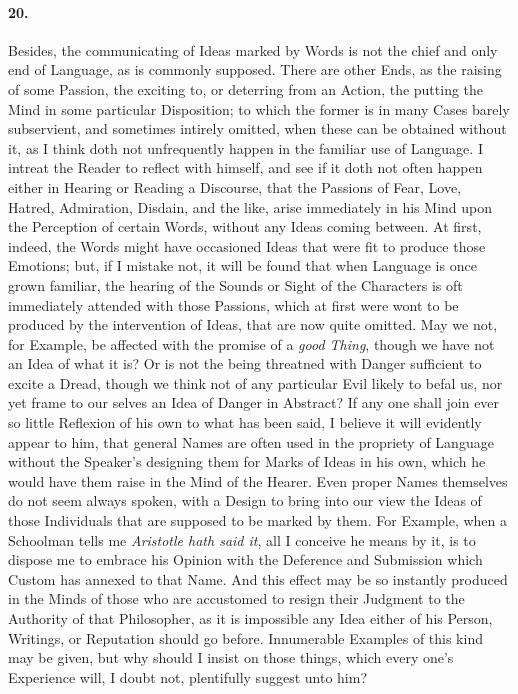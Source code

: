 \documentclass[]{article}
\newenvironment{sectionbody}{}{}
\begin{document}
\begin{sectionbody}
\paragraph{20.} Besides, the communicating of Ideas marked by Words is not the
chief and only end of Language, as is commonly supposed.  There
are other Ends, as the raising of some Passion, the exciting to,
or deterring from an Action, the putting the Mind in some
particular Disposition; to which the former is in many Cases
barely subservient, and sometimes intirely omitted, when these
can be obtained without it, as I think doth not unfrequently
happen in the familiar use of Language.  I intreat the Reader to
reflect with himself, and see if it doth not often happen either
in Hearing or Reading a Discourse, that the Passions of Fear,
Love, Hatred, Admiration, Disdain, and the like, arise
immediately in his Mind upon the Perception of certain Words,
without any Ideas coming between.  At first, indeed, the Words
might have occasioned Ideas that were fit to produce those
Emotions; but, if I mistake not, it will be found that when
Language is once grown familiar, the hearing of the Sounds or
Sight of the Characters is oft immediately attended with those
Passions, which at first were wont to be produced by the
intervention of Ideas, that are now quite omitted.  May we not,
for Example, be affected with the promise of a \emph{good
Thing}, though we have not an Idea of what it is? Or is not
the being threatned with Danger sufficient to excite a Dread,
though we think not of any particular Evil likely to befal us,
nor yet frame to our selves an Idea of Danger in Abstract? If any
one shall join ever so little Reflexion of his own to what has
been said, I believe it will evidently appear to him, that
general Names are often used in the propriety of Language without
the Speaker's designing them for Marks of Ideas in his own, which
he would have them raise in the Mind of the Hearer.  Even proper
Names themselves do not seem always spoken, with a Design to
bring into our view the Ideas of those Individuals that are
supposed to be marked by them.  For Example, when a Schoolman
tells me \emph{Aristotle hath said it}, all I conceive he means
by it, is to dispose me to embrace his Opinion with the Deference
and Submission which Custom has annexed to that Name.  And this
effect may be so instantly produced in the Minds of those who are
accustomed to resign their Judgment to the Authority of that
Philosopher, as it is impossible any Idea either of his Person,
Writings, or Reputation should go before.  Innumerable Examples
of this kind may be given, but why should I insist on those
things, which every one's Experience will, I doubt not,
plentifully suggest unto him?




\end{sectionbody}
\end{document}
